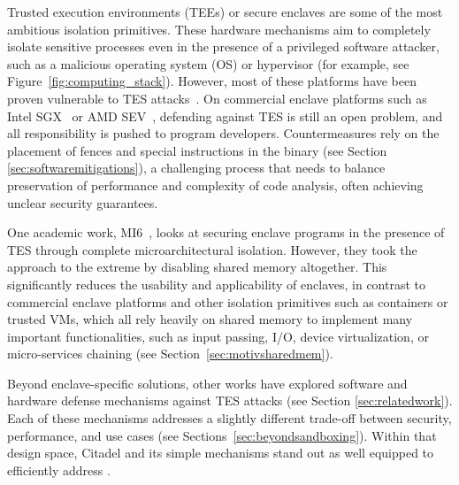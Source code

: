 Trusted execution environments (TEEs) or secure enclaves \cite{costan2016sanctum, ferraiuolo2017komodo, lee2020keystone,  bahmani2021cure, feng2021scalable, li2022design, cheng2024intel, costan2016intel, mckeen2013sgx, brasser2019sanctuary, sev2020strengthening, trustzone04, pinto2019demystifying} are some of the most ambitious isolation primitives.
These hardware mechanisms aim to completely isolate sensitive processes even in the presence of a privileged software attacker, such as a malicious operating system (OS) or hypervisor (for example, see Figure~\ref{fig:computing_stack}).
However, most of these platforms have been proven vulnerable to TES attacks~\cite{koruyeh2018spectre, chen2019sgxpectre, ryan2019hardware, van2020lvi, van2018foreshadow, van2020sgaxe, gotzfried2017cache, brasser2017software, gras2018translation, evtyushkin2018branchscope, aciiccmez2006predicting, wang2014timing, koruyeh2018spectre}.
On commercial enclave platforms such as Intel SGX~\cite{costan2016intel} or AMD SEV~\cite{sev2020strengthening}, defending against TES is still an open problem, and all responsibility is pushed to program developers.
Countermeasures rely on the placement of fences and special instructions in the binary (see Section \ref{sec:softwaremitigations}), a challenging process that needs to balance preservation of performance and complexity of code analysis, often achieving unclear security guarantees.

One academic work, MI6~\cite{bourgeat2019mi6}, looks at securing enclave programs in the presence of TES through complete microarchitectural isolation.
However, they took the approach to the extreme by disabling shared memory altogether.
This significantly reduces the usability and applicability of enclaves, in contrast to commercial enclave platforms and other isolation primitives such as containers or trusted VMs, which all rely heavily on shared memory to implement many important functionalities, such as input passing, I/O, device virtualization, or micro-services chaining (see Section~\ref{sec:motivsharedmem}).

Beyond enclave-specific solutions, other works have explored software and hardware defense mechanisms against TES attacks (see Section \ref{sec:relatedwork}).
Each of these mechanisms addresses a slightly different trade-off between security, performance, and use cases (see Sections~\ref{sec:beyondsandboxing}).
Within that design space, Citadel and its simple mechanisms stand out as well equipped to efficiently address \prob{}.
\\

